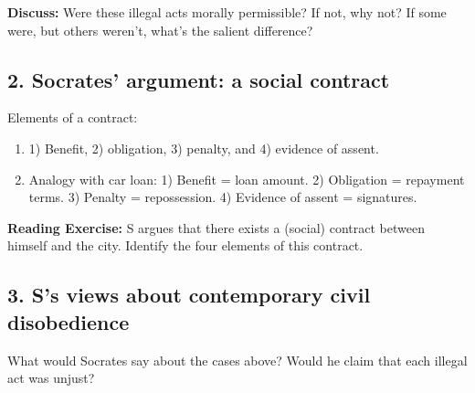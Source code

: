 \documentclass[oneside]{article}
\begin{document}
\textbf{Discuss:} Were these illegal acts morally permissible? If not, why not? If some were, but others weren't, what's the salient difference?


\subsection*{2. Socrates' argument: a social contract}

Elements of a contract:

\begin{enumerate}
\item[ ] 1) Benefit, 2) obligation, 3) penalty, and 4) evidence of assent.
\item[ ]  Analogy with car loan:  1) Benefit = loan amount. 2) Obligation = repayment terms. 3) Penalty = repossession. 4) Evidence of assent = signatures.\end{enumerate}
\textbf{Reading Exercise:} S argues that there exists a (social) contract between himself and the city. Identify the four elements of this contract.


\subsection*{3. S's views about contemporary civil disobedience}
 What would Socrates say about the cases above? Would he claim that each illegal act was unjust? 




\end{document}
